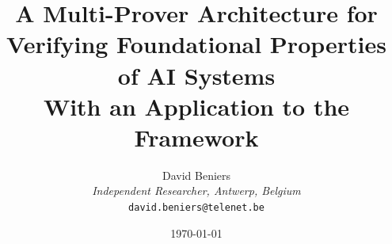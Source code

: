 \documentclass[11pt,a4paper]{article}
\title{\huge \textbf{A Multi-Prover Architecture for Verifying Foundational Properties of AI Systems} \\
\large With an Application to the \Apeiron{} Framework}
\author{
    David Beniers \\
    \small \textit{Independent Researcher, Antwerp, Belgium} \\
    \small \texttt{david.beniers@telenet.be}
}
\date{\today}
\begin{document}
\maketitle


\tableofcontents
\newpage


\FloatBarrier

\FloatBarrier

\FloatBarrier

\FloatBarrier

\FloatBarrier

\FloatBarrier

\FloatBarrier
\newpage
\printbibliography
\end{document}
